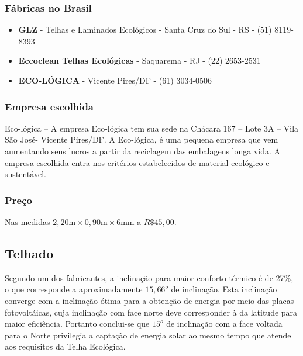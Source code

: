 \subsubsection*{\textbf{Fábricas no Brasil}}
	
	\begin{itemize}
	
		\item \textbf{GLZ} - Telhas e Laminados Ecológicos - Santa Cruz do Sul - RS - (51) 8119-8393

		\item \textbf{Eccoclean Telhas Ecológicas} - Saquarema - RJ - (22) 2653-2531

		\item \textbf{ECO-LÓGICA} - Vicente Pires/DF - (61) 3034-0506
	\end{itemize}

\subsubsection*{\textbf{Empresa escolhida}}
	Eco-lógica – A empresa Eco-lógica tem sua sede na Chácara 167 – Lote 3A – Vila São José- Vicente Pires/DF. A Eco-lógica, é uma pequena empresa que vem aumentando seus lucros a partir da reciclagem das embalagens longa vida. A empresa escolhida entra nos critérios estabelecidos de material ecológico e sustentável.

\subsubsection*{\textbf{Preço}}

	Nas medidas $2,20\si{\meter} \times 0,90\si{\meter} \times 6\si{\meter\meter}$ a $R\$ 45,00 $.\cite{ecologica}


\subsection{Telhado}

Segundo um dos fabricantes\cite{2013Onduline}, a inclinação para maior conforto térmico é de 27\%, o que corresponde a aproximadamente $15,66^o$ de inclinação. Esta inclinação converge com a inclinação ótima para a obtenção de energia por meio das placas fotovoltáicas, cuja inclinação com face norte deve corresponder à da latitude para maior eficiência\cite{2013Portal}. Portanto conclui-se que $15^o$ de inclinação com a face voltada para o Norte privilegia a captação de energia solar ao mesmo tempo que atende aos requisitos da Telha Ecológica.

